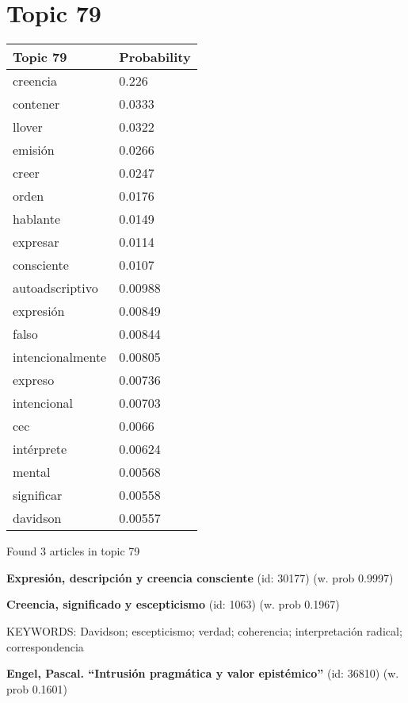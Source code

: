 \documentclass{article}
\begin{document}
\section*{Topic 79}\vfill
\begin{tabular}{ll}
\toprule
         Topic 79 & Probability \\
\midrule
         creencia &       0.226 \\
         contener &      0.0333 \\
           llover &      0.0322 \\
          emisión &      0.0266 \\
            creer &      0.0247 \\
            orden &      0.0176 \\
         hablante &      0.0149 \\
         expresar &      0.0114 \\
       consciente &      0.0107 \\
  autoadscriptivo &     0.00988 \\
        expresión &     0.00849 \\
            falso &     0.00844 \\
 intencionalmente &     0.00805 \\
          expreso &     0.00736 \\
      intencional &     0.00703 \\
              cec &      0.0066 \\
       intérprete &     0.00624 \\
           mental &     0.00568 \\
       significar &     0.00558 \\
         davidson &     0.00557 \\
\bottomrule
\end{tabular}

\vfill
Found 3 articles in topic 79
\vfill

\textbf{Expresión, descripción y creencia consciente} (id: 30177)
 (w. prob 0.9997)
\vfill

\textbf{Creencia, significado y escepticismo} (id: 1063)
 (w. prob 0.1967)


KEYWORDS:
Davidson; escepticismo; verdad; coherencia; interpretación radical; correspondencia
\vfill

\textbf{Engel, Pascal. “Intrusión pragmática y valor epistémico”} (id: 36810)
 (w. prob 0.1601)

\vfill
\newpage
\end{document}
